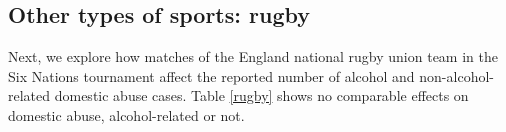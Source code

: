 \documentclass[12pt, a4paper]{article}
\begin{document}

\FloatBarrier


\subsection{Other types of sports: rugby}



Next, we explore how matches of the England national rugby union team in the Six Nations tournament affect the reported number of alcohol and non-alcohol-related domestic abuse cases. Table \ref{rugby} shows no comparable effects on domestic abuse, alcohol-related or not. 

\end{document}
